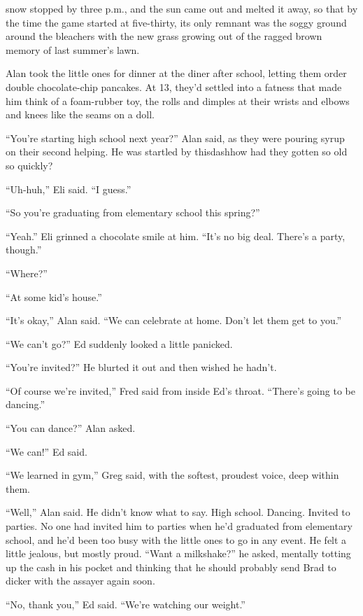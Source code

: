  snow stopped by three p.m., and the sun came out and melted it
away, so that by the time the game started at five-thirty, its only
remnant was the soggy ground around the bleachers with the new grass
growing out of the ragged brown memory of last summer's lawn.

Alan took the little ones for dinner at the diner after school,
letting them order double chocolate-chip pancakes.  At 13, they'd
settled into a fatness that made him think of a foam-rubber toy, the
rolls and dimples at their wrists and elbows and knees like the seams
on a doll.

``You're starting high school next year?'' Alan said, as they were
pouring syrup on their second helping.  He was startled by thisdash{}how
had they gotten so old so quickly?

``Uh-huh,'' Eli said.  ``I guess.''

``So you're graduating from elementary school this spring?''

``Yeah.'' Eli grinned a chocolate smile at him.  ``It's no big deal. 
There's a party, though.''

``Where?''

``At some kid's house.''

``It's okay,'' Alan said.  ``We can celebrate at home.  Don't let them
get to you.''

``We can't go?'' Ed suddenly looked a little panicked.

``You're invited?'' He blurted it out and then wished he hadn't.

``Of course we're invited,'' Fred said from inside Ed's throat. 
``There's going to be dancing.''

``You can dance?'' Alan asked.

``We can!'' Ed said.

``We learned in gym,'' Greg said, with the softest, proudest voice,
deep within them.

``Well,'' Alan said.  He didn't know what to say.  High school. 
Dancing.  Invited to parties.  No one had invited him to parties when
he'd graduated from elementary school, and he'd been too busy with the
little ones to go in any event.  He felt a little jealous, but mostly
proud.  ``Want a milkshake?'' he asked, mentally totting up the cash
in his pocket and thinking that he should probably send Brad to dicker
with the assayer again soon.

``No, thank you,'' Ed said.  ``We're watching our weight.''

